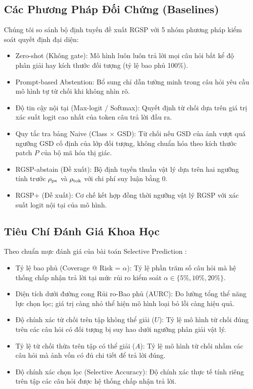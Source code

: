 \subsection{Các Phương Pháp Đối Chứng (Baselines)}
Chúng tôi so sánh bộ định tuyến đề xuất RGSP với 5 nhóm phương pháp kiểm soát quyết định đại diện:
\begin{itemize}
    \item Zero-shot (Không gate): Mô hình luôn luôn trả lời mọi câu hỏi bất kể độ phân giải hay kích thước đối tượng (tỷ lệ bao phủ 100\%).
    \item Prompt-based Abstention: Bổ sung chỉ dẫn tường minh trong câu hỏi yêu cầu mô hình tự từ chối khi không nhìn rõ.
    \item Độ tin cậy nội tại (Max-logit / Softmax): Quyết định từ chối dựa trên giá trị xác suất logit cao nhất của token câu trả lời đầu ra.
    \item Quy tắc tra bảng Naive (Class $\times$ GSD): Từ chối nếu GSD của ảnh vượt quá ngưỡng GSD cố định của lớp đối tượng, không chuẩn hóa theo kích thước patch $P$ của bộ mã hóa thị giác.
    \item RGSP-abstain (Đề xuất): Bộ định tuyến thuần vật lý dựa trên hai ngưỡng tính trước $\rho_{\mathrm{px}}$ và $\rho_{\mathrm{tok}}$ với chi phí suy luận bằng 0.
    \item RGSP+ (Đề xuất): Cơ chế kết hợp đồng thời ngưỡng vật lý RGSP với xác suất logit nội tại của mô hình.
\end{itemize}

\subsection{Tiêu Chí Đánh Giá Khoa Học}
Theo chuẩn mực đánh giá của bài toán Selective Prediction \cite{geifman2017selective, angelopoulos2021learn}:
\begin{itemize}
    \item Tỷ lệ bao phủ (Coverage @ Risk = $\alpha$): Tỷ lệ phần trăm số câu hỏi mà hệ thống chấp nhận trả lời tại mức rủi ro kiểm soát $\alpha \in \{5\%, 10\%, 20\%\}$.
    \item Diện tích dưới đường cong Rủi ro-Bao phủ (AURC): Đo lường tổng thể năng lực chọn lọc; giá trị càng nhỏ thể hiện mô hình loại bỏ lỗi càng hiệu quả.
    \item Độ chính xác từ chối trên tập không thể giải ($U$): Tỷ lệ mô hình từ chối đúng trên các câu hỏi có đối tượng bị suy hao dưới ngưỡng phân giải vật lý.
    \item Tỷ lệ từ chối thừa trên tập có thể giải ($A$): Tỷ lệ mô hình từ chối nhầm các câu hỏi mà ảnh vốn có đủ chi tiết để trả lời đúng.
    \item Độ chính xác chọn lọc (Selective Accuracy): Độ chính xác thực tế tính riêng trên tập các câu hỏi được hệ thống chấp nhận trả lời.
\end{itemize}
